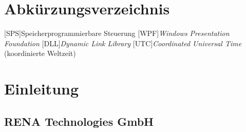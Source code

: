 \documentclass[
   ngerman          %
  ,a4paper          %
 ,12pt
]{article} %
\begin{document}
%
%
\listoffigures
\newpage

%
%
\section*{Abkürzungsverzeichnis}
\begin{acronym}
[SPS]{Speicherprogrammierbare Steuerung}
[WPF]{\textit{Windows Presentation Foundation}}
[DLL]{\textit{Dynamic Link Library}}
[UTC]{\textit{Coordinated Universal Time} (koordinierte Weltzeit)}
\end{acronym}
\newpage


%
%
\lstlistoflistings
\newpage


%
%
\tableofcontents 
\newpage



%
%
\pagestyle{fancy}
\setlength{\headheight}{28pt}

%
%
\section{Einleitung}
\subsection{RENA Technologies GmbH}

\newpage
\end{document}
